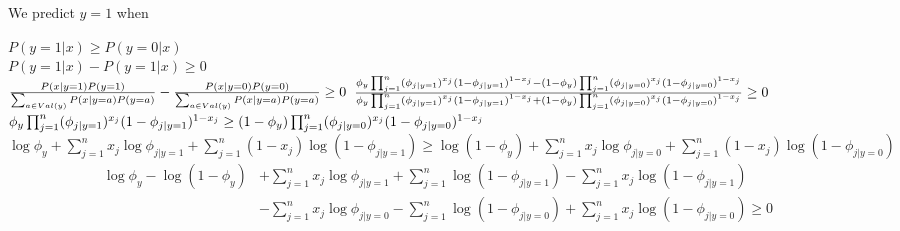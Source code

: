 \documentclass[11pt]{article}
\begin{document}
We predict $y=1$ when 

$P(y=1|x) \geq P(y=0|x)$ \\
$P(y=1|x) - P(y=1|x) \geq 0$ \\

$\frac{P(x|y=1)P(y=1)}{\sum_{a \in Val(y)} P(x|y=a)P(y=a)} - \frac{P(x|y=0)P(y=0)}{\sum_{a \in Val(y)} P(x|y=a)P(y=a)} \geq 0 \\\\\\$
$\frac{\phi_y \prod_{j=1}^n (\phi_{j|y=1})^{x_j} (1 - \phi_{j|y=1})^{1-x_j} - (1 - \phi_y) \prod_{j=1}^n (\phi_{j|y=0})^{x_j} (1 - \phi_{j|y=0})^{1 - x_j}}{\phi_y \prod_{j=1}^n (\phi_{j|y=1})^{x_j}(1 - \phi_{j|y=1})^{1-x_j} + (1 - \phi_y) \prod_{j=1}^n (\phi_{j|y=0})^{x_j}(1-\phi_{j|y=0})^{1-x_j}} \geq 0 \\\\\\$ 
$\phi_y \prod_{j=1}^n (\phi_{j|y=1})^{x_j} (1 - \phi_{j|y=1})^{1-x_j} \geq (1 - \phi_y) \prod_{j=1}^n (\phi_{j|y=0})^{x_j} (1 - \phi_{j|y=0})^{1 - x_j} \\$
$\log \phi_y + \sum_{j=1}^n x_j \log \phi_{j|y=1} + \sum_{j=1}^n (1-x_j) \log (1 - \phi_{j|y=1}) \geq \log (1 - \phi_y) + \sum_{j=1}^n x_j \log \phi_{j|y=0} + \sum_{j=1}^n (1-x_j) \log (1 - \phi_{j|y=0})$
\begin{align*}
    \log \phi_y - \log (1 - \phi_y) &+ \sum_{j=1}^n x_j \log \phi_{j|y=1} + \sum_{j=1}^n \log (1 - \phi_{j|y=1}) - \sum_{j=1}^n x_j \log (1 - \phi_{j|y=1}) \\
                                    &- \sum_{j=1}^n x_j \log \phi_{j|y=0} - \sum_{j=1}^n \log (1 - \phi_{j|y=0}) + \sum_{j=1}^n x_j \log (1 - \phi_{j|y=0}) \geq 0 \\
\end{align*}
\end{document}
